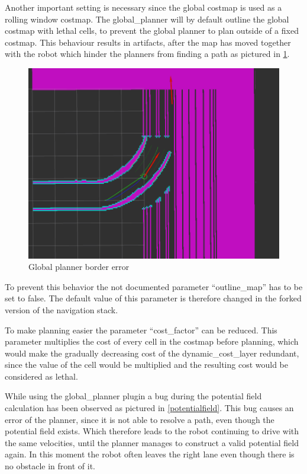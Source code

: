 Another important setting is necessary since the global costmap is used as a rolling window costmap. The global\_planner will by default outline the global costmap with lethal cells, to prevent the global planner to plan outside of a fixed costmap. This behaviour results in artifacts, after the map has moved together with the robot which hinder the planners from finding a path as pictured in \ref{boardererror}.

\begin{figure}[H]
	\centering
	\includegraphics[width=\textwidth]{Pictures/borders}
	
	\caption{Global planner border error}
	\label{boardererror}
\end{figure}

To prevent this behavior the not documented parameter ``outline\_map'' has to be set to false. The default value of this parameter is therefore changed in the forked version of the navigation stack.

To make planning easier the parameter ``cost\_factor'' can be reduced. This parameter multiplies the cost of every cell in the costmap before planning, which
 would make the gradually decreasing cost of the dynamic\_cost\_layer redundant, since the value of the cell would be multiplied and the resulting cost would be considered as lethal.
 
 
 While using the global\_planner plugin a bug during the potential field calculation has been observed as pictured in \ref{potentialfield}. This bug causes an error of the planner, since it is not able to resolve a path, even though the potential field exists. Which therefore leads to the robot continuing to drive with the same velocities,  until the planner manages to construct a valid potential field again. In this moment the robot often leaves the right lane even though there is no obstacle in front of it.\\
 
